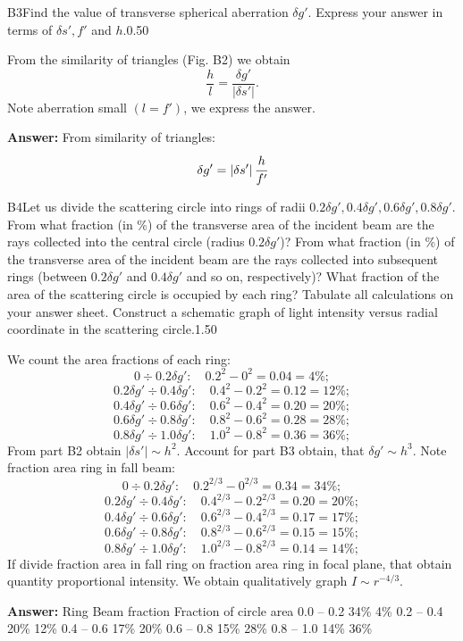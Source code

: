 \documentclass[11pt,a4paper]{article}
\begin{document}
\begin{solcard}{B3}{Find the value of transverse spherical aberration $\delta g'$. Express your answer in terms of $\delta s', f'$ and $h$.}{0.50}

From the similarity of triangles (Fig. B2) we obtain $$\frac{h}{l}=\frac{\delta g'}{|\delta s '|}.$$ Note aberration small $(l=f')$, we express the answer.

\par\smallskip\noindent\textbf{Answer:} From similarity of triangles: $$\delta g'=|\delta s'|\,\cfrac{h}{f'}$$
\end{solcard}

\begin{solcard}{B4}{Let us divide the scattering circle into rings of radii $0.2\delta g', 0.4\delta g', 0.6\delta g', 0.8\delta g'$. From what fraction (in \%) of the transverse area of the incident beam are the rays collected into the central circle (radius $0.2\delta g'$)? From what fraction (in \%) of the transverse area of the incident beam are the rays collected into subsequent rings (between $0.2\delta g'$ and $0.4\delta g'$ and so on, respectively)? What fraction of the area of the scattering circle is occupied by each ring? Tabulate all calculations on your answer sheet. Construct a schematic graph of light intensity versus radial coordinate in the scattering circle.}{1.50}

We count the area fractions of each ring: $$0 \div 0.2\delta g' : \quad 0.2^2-0^2 = 0.04 = 4\%;$$ $$0.2\delta g' \div 0.4\delta g' : \quad 0.4^2-0.2^2 = 0.12 = 12\%;$$ $$0.4\delta g' \div 0.6\delta g' : \quad 0.6^2-0.4^2 = 0.20 = 20\%;$$ $$0.6\delta g' \div 0.8\delta g' : \quad 0.8^2-0.6^2 = 0.28 = 28\%;$$ $$0.8\delta g' \div 1.0\delta g' : \quad 1.0^2-0.8^2 = 0.36 = 36\%;$$ From part B2 obtain $|\delta s'| \sim h^2$. Account for part B3 obtain, that $\delta g' \sim h^3.$ Note fraction area ring in fall beam: $$0 \div 0.2\delta g' : \quad 0.2^{2/3}-0^{2/3} = 0.34 = 34\%;$$ $$0.2\delta g' \div 0.4\delta g' : \quad 0.4^{2/3}-0.2^{2/3} = 0.20 = 20\%;$$ $$0.4\delta g' \div 0.6\delta g' : \quad 0.6^{2/3}-0.4^{2/3} = 0.17 = 17\%;$$ $$0.6\delta g' \div 0.8\delta g' : \quad 0.8^{2/3}-0.6^{2/3} = 0.15 = 15\%;$$ $$0.8\delta g' \div 1.0\delta g' : \quad 1.0^{2/3}-0.8^{2/3} = 0.14 = 14\%;$$ If divide fraction area in fall ring on fraction area ring in focal plane, that obtain quantity proportional intensity. We obtain qualitatively graph $I\sim r^{-4/3}$.

\par\smallskip\noindent\textbf{Answer:} Ring Beam fraction Fraction of circle area 0.0 – 0.2 34\% 4\% 0.2 – 0.4 20\% 12\% 0.4 – 0.6 17\% 20\% 0.6 – 0.8 15\% 28\% 0.8 – 1.0 14\% 36\%
\end{solcard}
\end{document}
